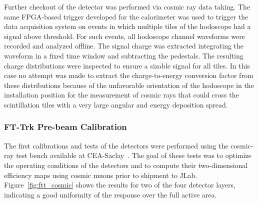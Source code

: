 Further checkout of the detector was performed via cosmic ray data taking. The same FPGA-based trigger developed
for the calorimeter was used to trigger the data acquisition system on events in which multiple tiles of the hodoscope
had a signal above threshold. For such events, all hodoscope channel waveforms were recorded and analyzed offline.
The signal charge was extracted integrating the waveform in a fixed time window and subtracting the pedestals. The
resulting charge distributions were inspected to ensure a sizable signal for all tiles. In this case no attempt was made to
extract the charge-to-energy conversion factor from these distributions because of the unfavorable orientation of
the hodoscope in the installation position for the measurement of cosmic rays that could cross the scintillation tiles with
a very large angular and energy deposition spread.

\subsubsection{FT-Trk Pre-beam Calibration}

The first calibrations and tests of the detectors were performed using the cosmic-ray test bench available at
CEA-Saclay~\cite{mm}. The goal of these tests was to optimize the operating conditions of the detectors and to
compute their two-dimensional efficiency maps using cosmic muons prior to shipment to JLab.
Figure~\ref{fig:ftt_cosmic} shows the results for two of the four detector layers, indicating a good uniformity of
the response over the full active area. 

